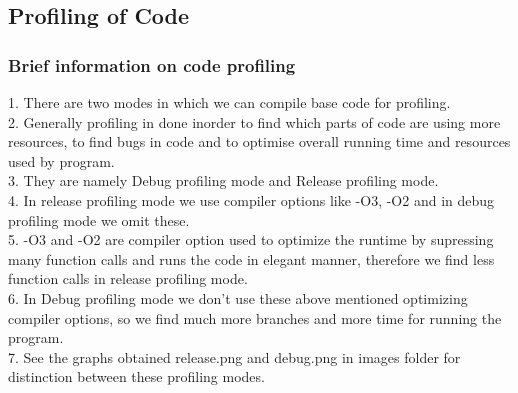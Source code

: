 \documentclass[11pt]{article}
\begin{document}
\subsection{Profiling of Code}
\subsubsection{Brief information on code profiling}
1. There are two modes in which we can compile base code for profiling.\\
2. Generally profiling in done inorder to find which parts of code are using more resources, to find bugs in code and to 		   optimise overall running time and resources used by program.\\	
3. They are namely Debug profiling mode and Release profiling mode.\\
4. In release profiling mode we use compiler options like -O3, -O2 and in debug profiling mode we omit these. \\
5. -O3 and -O2 are compiler option used to optimize the runtime by supressing many function calls and runs the code in elegant 		manner, therefore we find less function calls in release profiling mode.\\
6. In Debug profiling mode we don't use these above mentioned optimizing compiler options, so we find much more branches and 	   more time for running the program.\\
7. See the graphs obtained release.png and debug.png in images folder for distinction between these profiling modes.\\
\end{document}
